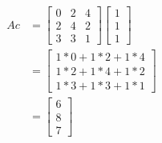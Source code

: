 \section{}

\subsection{}
\begin{align*}
    Ac
    &= \begin{bmatrix}
	0 & 2 & 4 \\
	2 & 4 & 2 \\
	3 & 3 & 1
    \end{bmatrix}
    \begin{bmatrix}
	1 \\
	1 \\
	1
    \end{bmatrix} \\
    &= \begin{bmatrix}
	1 * 0 + 1 * 2 + 1 * 4 \\
	1 * 2 + 1 * 4 + 1 * 2 \\
	1 * 3 + 1 * 3 + 1 * 1
    \end{bmatrix} \\
    &= \begin{bmatrix}
	6 \\
	8 \\
	7
    \end{bmatrix}
\end{align*}

